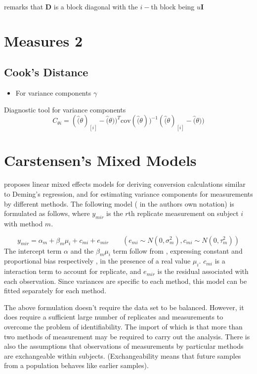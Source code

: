 \documentclass[12pt, a4paper]{report}
\theoremstyle{plain}
\theoremstyle{definition}
\theoremstyle{remark}
\begin{document}
\citet{Zewotir} remarks that $\boldsymbol{D}$ is a block diagonal with the $i-$th block being $u \boldsymbol{I}$

\section{Measures 2} %

\subsection{Cook's Distance} %
\begin{itemize}
	\item For variance components $\gamma$
\end{itemize}

Diagnostic tool for variance components
\[ C_{\theta i} =(\hat(\theta)_{[i]} - \hat(\theta))^{T}\mbox{cov}( \hat(\theta))^{-1}(\hat(\theta)_{[i]} - \hat(\theta))\]





\section{Carstensen's Mixed Models}

\citet{BXC2004} proposes linear mixed effects models for deriving
conversion calculations similar to Deming's regression, and for
estimating variance components for measurements by different
methods. The following model ( in the authors own notation) is
formulated as follows, where $y_{mir}$ is the $r$th replicate
measurement on subject $i$ with method $m$.

\begin{equation}
y_{mir}  = \alpha_{m} + \beta_{m}\mu_{i} + c_{mi} + e_{mir} \qquad
( e_{mi} \sim N(0,\sigma^{2}_{m}), c_{mi} \sim N(0,\tau^{2}_{m}))
\end{equation}
The intercept term $\alpha$ and the $\beta_{m}\mu_{i}$ term follow
from \citet{DunnSEME}, expressing constant and proportional bias
respectively , in the presence of a real value $\mu_{i}.$
$c_{mi}$ is a interaction term to account for replicate, and
$e_{mir}$ is the residual associated with each observation.
Since variances are specific to each method, this model can be
fitted separately for each method.

The above formulation doesn't require the data set to be balanced.
However, it does require a sufficient large number of replicates
and measurements to overcome the problem of identifiability. The
import of which is that more than two methods of measurement may
be required to carry out the analysis. There is also the
assumptions that observations of measurements by particular
methods are exchangeable within subjects. (Exchangeability means
that future samples from a population behaves like earlier
samples).
\end{document}
